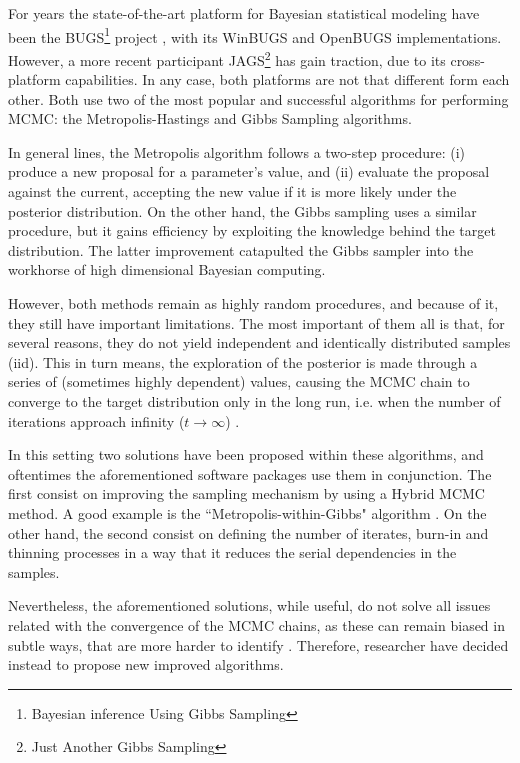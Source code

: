 For years the state-of-the-art platform for Bayesian statistical modeling have been the BUGS\footnote{Bayesian inference Using Gibbs Sampling} project \cite{Lunn_et_al_2000, Lunn_et_al_2009}, with its WinBUGS and OpenBUGS implementations. However, a more recent participant JAGS\footnote{Just Another Gibbs Sampling} \cite{Plummer_2003} has gain traction, due to its cross-platform capabilities. In any case, both platforms are not that different form each other. Both use two of the most popular and successful algorithms for performing MCMC: the Metropolis-Hastings \cite{Metropolis_et_al_1953, Hastings_1970} and Gibbs Sampling \cite{Geman_et_al_1984} algorithms.

In general lines, the Metropolis algorithm follows a two-step procedure: (i) produce a new proposal for a parameter's value, and (ii) evaluate the proposal against the current, accepting the new value if it is more likely under the posterior distribution. On the other hand, the Gibbs sampling uses a similar procedure, but it gains efficiency by exploiting the knowledge behind the target distribution. The latter improvement catapulted the Gibbs sampler into the workhorse of high dimensional Bayesian computing. 

However, both methods remain as highly random procedures, and because of it, they still have important limitations. The most important of them all is that, for several reasons, they do not yield independent and identically distributed samples (iid). This in turn means, the exploration of the posterior is made through a series of (sometimes highly dependent) values, causing the MCMC chain to converge to the target distribution only in the long run, i.e. when the number of iterations approach infinity ($t \rightarrow \infty$) \cite{Gelman_et_al_2014}. 

In this setting two solutions have been proposed within these algorithms, and oftentimes the aforementioned software packages use them in conjunction. The first consist on  improving the sampling mechanism by using a Hybrid MCMC method. A good example is the ``Metropolis-within-Gibbs" algorithm \cite{Muller_1991}. On the other hand, the second consist on defining the number of iterates, burn-in and thinning processes in a way that it reduces the serial dependencies in the samples.

Nevertheless, the aforementioned solutions, while useful, do not solve all issues related with the convergence of the MCMC chains, as these can remain biased in subtle ways, that are more harder to identify \cite{McElreath_2020}. Therefore, researcher have decided instead to propose new improved algorithms. 

